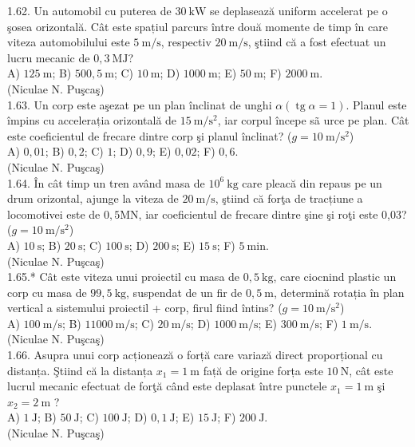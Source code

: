 1.62. Un automobil cu puterea de $30 \mathrm{~kW}$ se deplasează uniform accelerat pe o şosea orizontală. Cât este spațiul parcurs între două momente de timp în care viteza automobilului este $5 \mathrm{~m} / \mathrm{s}$, respectiv $20 \mathrm{~m} / \mathrm{s}$, ştiind că a fost efectuat un lucru mecanic de $0,3 \mathrm{~MJ}$?\\ A) $125 \mathrm{~m}$; B) $500,5 \mathrm{~m}$; C) $10 \mathrm{~m}$; D) $1000 \mathrm{~m}$; E) $50 \mathrm{~m}$; F) $2000 \mathrm{~m}$.\\ (Niculae N. Puşcaş)\\

1.63. Un corp este aşezat pe un plan înclinat de unghi $\alpha (\operatorname{tg} \alpha=1)$. Planul este împins cu accelerația orizontală de $15 \mathrm{~m} / \mathrm{s}^{2}$, iar corpul începe sã urce pe plan. Cât este coeficientul de frecare dintre corp şi planul înclinat? ($g=10 \mathrm{~m} / \mathrm{s}^{2}$)\\ A) $0,01$; B) $0,2$; C) $1$; D) $0,9$; E) $0,02$; F) $0,6$.\\ (Niculae N. Puşcaş)\\

1.64. În cât timp un tren având masa de $10^{6} \mathrm{~kg}$ care pleacă din repaus pe un drum orizontal, ajunge la viteza de $20 \mathrm{~m} / \mathrm{s}$, ştiind că forţa de tracțiune a locomotivei este de $0,5 \mathrm{MN}$, iar coeficientul de frecare dintre şine şi roţi este 0,03? ($g=10 \mathrm{~m} / \mathrm{s}^{2}$)\\ A) $10 \mathrm{~s}$; B) $20 \mathrm{~s}$; C) $100 \mathrm{~s}$; D) $200 \mathrm{~s}$; E) $15 \mathrm{~s}$; F) $5 \mathrm{~min}$.\\ (Niculae N. Puşcaş)\\

1.65.* Cât este viteza unui proiectil cu masa de $0,5 \mathrm{~kg}$, care ciocnind plastic un corp cu masa de $99,5 \mathrm{~kg}$, suspendat de un fir de $0,5 \mathrm{~m}$, determină rotația în plan vertical a sistemului proiectil + corp, firul fiind întins? ($g=10 \mathrm{~m} / \mathrm{s}^{2}$)\\ A) $100 \mathrm{~m} / \mathrm{s}$; B) $11000 \mathrm{~m} / \mathrm{s}$; C) $20 \mathrm{~m} / \mathrm{s}$; D) $1000 \mathrm{~m} / \mathrm{s}$; E) $300 \mathrm{~m} / \mathrm{s}$; F) $1 \mathrm{~m} / \mathrm{s}$.\\ (Niculae N. Puşcaş)\\

1.66. Asupra unui corp acționează o forță care variază direct proporțional cu distanța. Ştiind că la distanța $x_{1}=1 \mathrm{~m}$ față de origine forța este $10 \mathrm{~N}$, cât este lucrul mecanic efectuat de forţă când este deplasat între punctele $x_{1}=1 \mathrm{~m}$ şi $x_{2}=2 \mathrm{~m}$ ?\\ A) $1 \mathrm{~J}$; B) $50 \mathrm{~J}$; C) $100 \mathrm{~J}$; D) $0,1 \mathrm{~J}$; E) $15 \mathrm{~J}$; F) $200 \mathrm{~J}$.\\ (Niculae N. Puşcaş)\\


